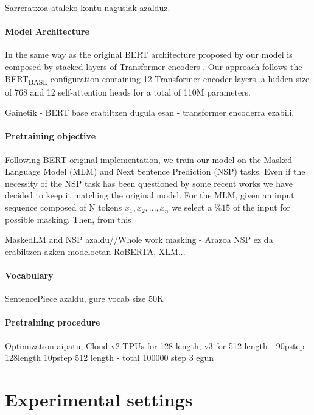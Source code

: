\documentclass[10pt, a4paper]{article}
\begin{document}
Sarreratxoa ataleko kontu nagusiak azalduz. 

\paragraph{Model Architecture}

In the same way as the original BERT architecture proposed by  our model is composed by stacked layers of Transformer encoders \cite{vaswani2017attention}. Our approach follows the BERT\textsubscript{BASE} configuration containing 12 Transformer encoder layers, a hidden size of 768 and 12 self-attention heads for a total of 110M parameters. 

Gainetik - BERT base erabiltzen dugula esan - transformer encoderra ezabili.

\paragraph{Pretraining objective}

Following BERT original implementation, we train our model on the Masked Language Model (MLM) and Next Sentence Prediction (NSP) tasks. Even if the necessity of the NSP task has been questioned by some recent works \cite{yang2019xlnet,liu2019roberta,lample2019cross} we have decided to keep it matching the original model. For the MLM, given an input sequence composed of N tokens $x_1, x_2, ..., x_n$ we select a $\%15$ of the input for possible masking. Then, from this 

MaskedLM and NSP azaldu//Whole work masking - Arazoa NSP ez da erabiltzen azken modeloetan RoBERTA, XLM...


\paragraph{Vocabulary}

SentencePiece azaldu,  gure vocab size 50K

\paragraph{Pretraining procedure}

Optimization aipatu, Cloud v2 TPUs for 128 length, v3 for 512 length - 90pstep 128length 10pstep 512 length - total 100000 step 3 egun


\section{Experimental settings}\label{sec:exper-sett}
\end{document}
